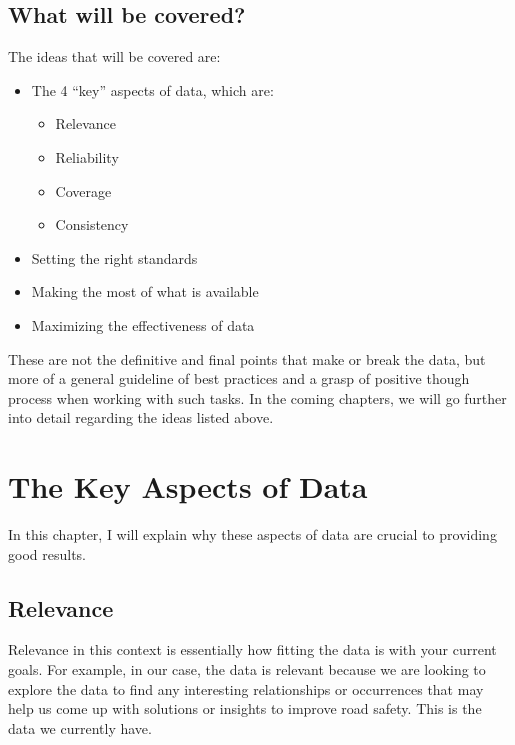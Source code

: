 \documentclass[
]{book}
\providecommand{\tightlist}{%
  \setlength{\itemsep}{0pt}\setlength{\parskip}{0pt}}
\begin{document}
\hypertarget{what-will-be-covered}{%
\section{What will be covered?}\label{what-will-be-covered}}

The ideas that will be covered are:

\begin{itemize}
\tightlist
\item
  The 4 ``key'' aspects of data, which are:

  \begin{itemize}
  \tightlist
  \item
    Relevance
  \item
    Reliability
  \item
    Coverage
  \item
    Consistency
  \end{itemize}
\item
  Setting the right standards
\item
  Making the most of what is available
\item
  Maximizing the effectiveness of data
\end{itemize}

These are not the definitive and final points that make or break the data, but more of a general guideline of best practices and a grasp of positive though process when working with such tasks. In the coming chapters, we will go further into detail regarding the ideas listed above.

\hypertarget{the-key-aspects-of-data}{%
\chapter{The Key Aspects of Data}\label{the-key-aspects-of-data}}

In this chapter, I will explain why these aspects of data are crucial to providing good results.

\hypertarget{relevance}{%
\section{Relevance}\label{relevance}}

Relevance in this context is essentially how fitting the data is with your current goals. For example, in our case, the data is relevant because we are looking to explore the data to find any interesting relationships or occurrences that may help us come up with solutions or insights to improve road safety. This is the data we currently have.
\end{document}
